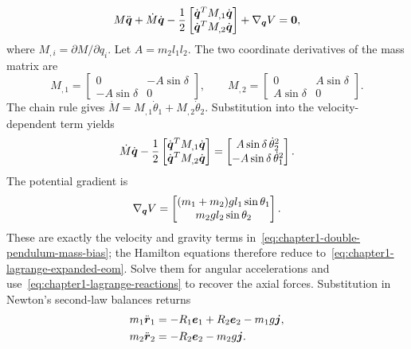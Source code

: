 \documentclass[../main.tex]{subfiles}
\begin{document}
\begin{equation}
M\ddot{\boldsymbol{q}}+\dot M\dot{\boldsymbol{q}}
-\frac12\begin{bmatrix}
\dot{\boldsymbol{q}}^{T}M_{,1}\dot{\boldsymbol{q}}\\
\dot{\boldsymbol{q}}^{T}M_{,2}\dot{\boldsymbol{q}}
\end{bmatrix}
+\nabla_{\boldsymbol{q}}V=\boldsymbol{0},
\label{eq:chapter1-hamilton-reduced-eom}
\end{equation}
where $M_{,i}=\partial M/\partial q_i$. Let $A=m_2l_1l_2$. The two coordinate derivatives of the mass matrix are
\begin{equation}
M_{,1}=\begin{bmatrix}0&-A\sin\delta\\-A\sin\delta&0\end{bmatrix},
\qquad
M_{,2}=\begin{bmatrix}0&A\sin\delta\\A\sin\delta&0\end{bmatrix}.
\label{eq:chapter1-hamilton-mass-derivatives}
\end{equation}
The chain rule gives $\dot M=M_{,1}\dot\theta_1+M_{,2}\dot\theta_2$. Substitution into the velocity-dependent term yields
\begin{equation}
\dot M\dot{\boldsymbol{q}}-\frac12
\begin{bmatrix}
\dot{\boldsymbol{q}}^{T}M_{,1}\dot{\boldsymbol{q}}\\
\dot{\boldsymbol{q}}^{T}M_{,2}\dot{\boldsymbol{q}}
\end{bmatrix}
=\begin{bmatrix}
A\sin\delta\,\dot\theta_2^2\\
-A\sin\delta\,\dot\theta_1^2
\end{bmatrix}.
\label{eq:chapter1-hamilton-velocity-bias}
\end{equation}
The potential gradient is
\begin{equation}
\nabla_{\boldsymbol{q}}V=\begin{bmatrix}
(m_1+m_2)gl_1\sin\theta_1\\m_2gl_2\sin\theta_2
\end{bmatrix}.
\label{eq:chapter1-hamilton-potential-gradient}
\end{equation}
These are exactly the velocity and gravity terms in~\eqref{eq:chapter1-double-pendulum-mass-bias}; the Hamilton equations therefore reduce to~\eqref{eq:chapter1-lagrange-expanded-eom}. Solve them for angular accelerations and use~\eqref{eq:chapter1-lagrange-reactions} to recover the axial forces. Substitution in Newton's second-law balances returns
\begin{equation}
\begin{aligned}
m_1\ddot{\boldsymbol{r}}_1 &= -R_1\boldsymbol{e}_1+R_2\boldsymbol{e}_2-m_1g\boldsymbol{j},\\
m_2\ddot{\boldsymbol{r}}_2 &= -R_2\boldsymbol{e}_2-m_2g\boldsymbol{j}.
\end{aligned}
\label{eq:chapter1-hamilton-common-form}
\end{equation}
\end{document}
